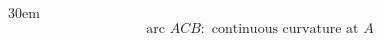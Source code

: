 \documentclass[border=4pt]{standalone}
\begin{document}
\begin{varwidth}{30em}
\large
\[ \text{arc } ACB : \text{ continuous curvature at } A \]

\end{varwidth}
\end{document}

